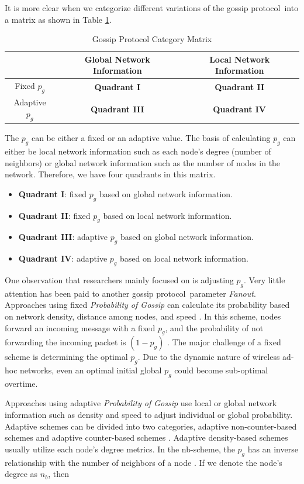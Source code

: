 \documentclass[onehalf,11pt]{beavtex}
\newcommand{\gp}{gossip protocol}
\newcommand{\pog}{Probability of Gossip}
\begin{document}
It is more clear when we categorize different variations of the \gp ~into a matrix as shown in Table \ref{table:matrix}. 

\begin{table}[h]
	\centering
	\caption{Gossip Protocol Category Matrix}
	\label{table:matrix}
	\centering
	\begin{tabular}{|c|c|c|}
		\hline 
		& Global Network Information & Local Network Information \\ 
		\hline 
		Fixed  $p_g$ & \textbf{Quadrant I} & \textbf{Quadrant II} \\ 
		\hline 
		Adaptive $p_g$ & \textbf{Quadrant III} & \textbf{Quadrant IV} \\ 
		\hline 
	\end{tabular} 
\end{table}

The $p_g$ can be either a fixed or an adaptive value. The basis of calculating $p_g$ can either be local network information such as each node's degree (number of neighbors) or global network information such as the number of nodes in the network. Therefore, we have four quadrants in this matrix. 

\begin{itemize}
	\item \textbf{Quadrant I}: fixed $p_g$ based on global network information. 
	\item \textbf{Quadrant II}: fixed $p_g$ based on local network information. 
	\item \textbf{Quadrant III}: adaptive $p_g$ based on global network information. 
	\item \textbf{Quadrant IV}: adaptive $p_g$ based on local network information. 
\end{itemize}

One observation that researchers mainly focused on is adjusting $p_g$. Very little attention has been paid to another \gp ~parameter \emph{Fanout}. Approaches using fixed \emph{\pog} can calculate its probability based on network density, distance among nodes, and speed \cite{2015survey}. In this scheme, nodes forward an incoming message with a fixed $p_g$, and the probability of not forwarding the incoming packet is $(1-p_g)$ \cite{2015survey}. The major challenge of a fixed scheme is determining the optimal $p_g$. Due to the dynamic nature of wireless ad-hoc networks, even an optimal initial global $p_g$ could become sub-optimal overtime. 

Approaches using adaptive \emph{\pog} use local or global network information such as density and speed to adjust individual or global probability. Adaptive schemes can be divided into two categories, adaptive non-counter-based schemes and adaptive counter-based schemes \cite{2015survey}. Adaptive density-based schemes usually utilize each node's degree metrics. In the nb-scheme, the $p_g$ has an inverse relationship with the number of neighbors of a node \cite{cartigny2003border}. If we denote the node's degree as $n_b$, then 
\end{document}
